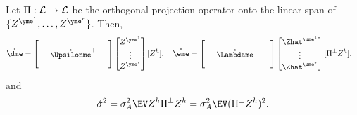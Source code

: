 \documentclass[main.tex]{subfiles}
\begin{document}
\begin{prop}\label{prop:vReExpression}
  Let $\Pi: \mathcal{L} \to \mathcal{L}$ be the orthogonal projection operator onto the linear span of $\{ Z^{\yme^1}, \ldots,  Z^{\yme^r}\}$.
  Then,
  \begin{align}
  \mathring{\dme}
    &=
      \begin{bmatrix}
      \phz
        &\phz
          &\phz\\
      \phz
        &\mathring{\Upsilonme }^+
          &\phz\\
      \phz
        &\phz
          &\phz
      \end{bmatrix}
      \begin{bmatrix}
         Z^{\yme^1}\\
        \vdots\\
         Z^{\yme^r}
      \end{bmatrix}
         [Z^{h}]
      ,
      \quad
  \mathring{\eme}
      =
      \begin{bmatrix}
        \phz
          &\phz
            &\phz\\
        \phz
          &\mathring{\Lambdame }^+
            &\phz\\
        \phz
          &\phz
            &\phz
        \end{bmatrix}
        \begin{bmatrix}
          \Zhat^{\ume^1}\\
          \vdots\\
          \Zhat^{\ume^s}
        \end{bmatrix}
        [\Pi^\perp  Z^{h}]
      .
      \label{eqn:xi&zetaLimit}
  \end{align}
  and
  \begin{equation}
    \mathring\sigma^2 = \sigma_A^2 \EV Z^h \Pi^\perp Z^h
      = \sigma_A^2 \EV (\Pi^\perp Z^h)^2
      .
    \label{eqn:sigmalimitPiPerp}
  \end{equation}
  \end{prop}
  
\end{document}
